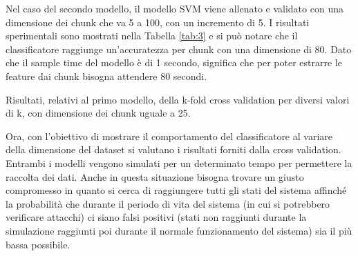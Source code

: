 \documentclass[Lau,binding=0.6cm]{sapthesis}
\begin{document}
Nel caso del secondo modello, il modello SVM viene allenato e validato con una dimensione dei chunk che va 5 a 100, con un incremento di 5.
I risultati sperimentali sono mostrati nella Tabella \ref{tab:3} e si pu\`o notare che il classificatore raggiunge un'accuratezza per chunk con una dimensione di 80.
Dato che il sample time del modello \`e di 1 secondo, significa che per poter estrarre le feature dai chunk bisogna attendere 80 secondi.

\begin{table}[htb]
    \begin{center}
    \end{center}   
    \caption{Risultati, relativi al primo modello, della k-fold cross validation per diversi valori di k, con dimensione dei chunk uguale a 25.} 
    \label{tab:4}
    \begin{center}
    \end{center}
    \caption{Risultati, relativi al secondo modello, della k-fold cross validation per diversi valori di k, con dimensione dei chunk uguale a 80.}
    \label{tab:5}
\end{table}

Ora, con l'obiettivo di mostrare il comportamento del classificatore al variare della dimensione del dataset si valutano i risultati  forniti dalla cross validation.
Entrambi i modelli vengono simulati per un determinato tempo per permettere la raccolta dei dati. Anche in questa situazione bisogna trovare un giusto compromesso in quanto 
si cerca di raggiungere tutti gli stati del sistema affinché la probabilit\`a che durante il periodo di vita del sistema (in cui si potrebbero verificare attacchi) ci siano falsi positivi (stati non raggiunti durante la simulazione raggiunti poi durante il normale funzionamento del sistema) sia il pi\`u bassa possibile.
\end{document}
